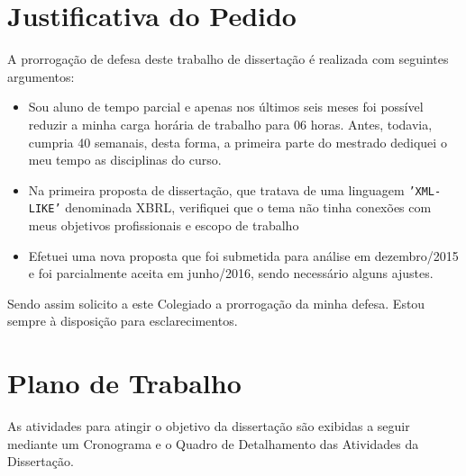 \documentclass[10pt,a4paper]{report}
\begin{document}
\section{Justificativa do Pedido}
\label{justificativa}

A prorrogação de defesa deste trabalho de dissertação é realizada com seguintes argumentos:

\begin{itemize}
	\item Sou aluno de tempo parcial e apenas nos últimos seis meses foi possível	reduzir a minha carga horária de trabalho para 06 horas. Antes, todavia, cumpria 40 semanais, desta forma, a primeira parte do 
	mestrado dediquei o meu tempo as disciplinas do curso. 
	\item  Na primeira proposta de dissertação, que tratava de uma linguagem
	\texttt{'XML-LIKE'} denominada XBRL, verifiquei que o tema não tinha conexões com meus objetivos profissionais e escopo de trabalho
	\item Efetuei uma nova proposta que foi submetida para análise em dezembro/2015 e foi parcialmente aceita em junho/2016, sendo necessário alguns ajustes.
\end{itemize}

Sendo assim solicito a este Colegiado a prorrogação da minha defesa. Estou
sempre à disposição para esclarecimentos.

\section{Plano de Trabalho}
\label{Plano de Trabalho}
 As atividades para atingir o objetivo da dissertação são exibidas a seguir mediante um Cronograma e o Quadro de Detalhamento das Atividades da Dissertação. 

 
 
 



\end{document}
